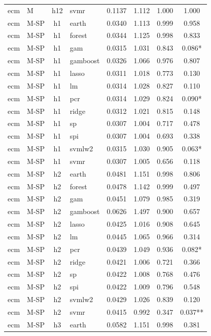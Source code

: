 \begin{ThreePartTable}
\begin{longtable}[t]{llclcccc}
ecm & M & h12 & svmr & 0.1137 & 1.112 & 1.000 & 1.000\\
\addlinespace
ecm & M-SP & h1 & earth & 0.0340 & 1.113 & 0.999 & 0.958\\
ecm & M-SP & h1 & forest & 0.0344 & 1.125 & 0.998 & 0.833\\
ecm & M-SP & h1 & gam & 0.0315 & 1.031 & 0.843 & 0.086*\\
ecm & M-SP & h1 & gamboost & 0.0326 & 1.066 & 0.976 & 0.807\\
ecm & M-SP & h1 & lasso & 0.0311 & 1.018 & 0.773 & 0.130\\
ecm & M-SP & h1 & lm & 0.0314 & 1.028 & 0.827 & 0.110\\
ecm & M-SP & h1 & pcr & 0.0314 & 1.029 & 0.824 & 0.090*\\
ecm & M-SP & h1 & ridge & 0.0312 & 1.021 & 0.815 & 0.148\\
ecm & M-SP & h1 & sp & 0.0307 & 1.004 & 0.717 & 0.478\\
ecm & M-SP & h1 & spi & 0.0307 & 1.004 & 0.693 & 0.338\\
ecm & M-SP & h1 & svmlw2 & 0.0315 & 1.030 & 0.905 & 0.063*\\
ecm & M-SP & h1 & svmr & 0.0307 & 1.005 & 0.656 & 0.118\\
\addlinespace
ecm & M-SP & h2 & earth & 0.0481 & 1.151 & 0.998 & 0.806\\
ecm & M-SP & h2 & forest & 0.0478 & 1.142 & 0.999 & 0.497\\
ecm & M-SP & h2 & gam & 0.0451 & 1.079 & 0.985 & 0.319\\
ecm & M-SP & h2 & gamboost & 0.0626 & 1.497 & 0.900 & 0.657\\
ecm & M-SP & h2 & lasso & 0.0425 & 1.016 & 0.908 & 0.645\\
ecm & M-SP & h2 & lm & 0.0445 & 1.065 & 0.966 & 0.314\\
ecm & M-SP & h2 & pcr & 0.0439 & 1.049 & 0.936 & 0.082*\\
ecm & M-SP & h2 & ridge & 0.0421 & 1.006 & 0.721 & 0.366\\
ecm & M-SP & h2 & sp & 0.0422 & 1.008 & 0.768 & 0.476\\
ecm & M-SP & h2 & spi & 0.0422 & 1.009 & 0.796 & 0.548\\
ecm & M-SP & h2 & svmlw2 & 0.0429 & 1.026 & 0.839 & 0.120\\
ecm & M-SP & h2 & svmr & 0.0415 & 0.992 & 0.347 & 0.037**\\
\addlinespace
ecm & M-SP & h3 & earth & 0.0582 & 1.151 & 0.998 & 0.381\\

\end{longtable}
\end{ThreePartTable}
